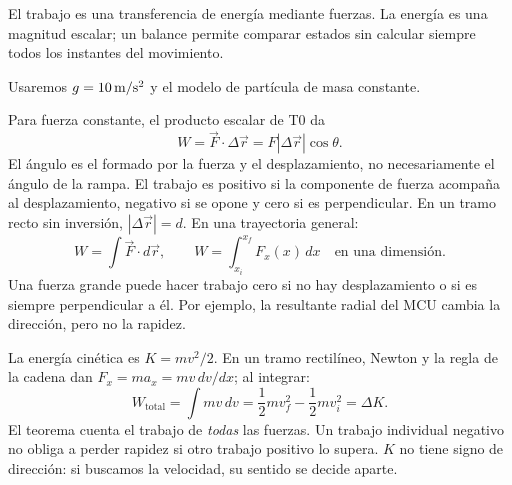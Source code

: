 \documentclass[11pt,a4paper]{article}
\begin{document}
\shorthandoff{<>}
\color{Ink}
El trabajo es una transferencia de energ\'ia mediante fuerzas.
La energ\'ia es una magnitud escalar; un balance permite comparar estados sin
calcular siempre todos los instantes del movimiento.
\begin{lessonindex}
\end{lessonindex}
Usaremos $g=10\,\mathrm{m/s^2}$ y el modelo de part\'icula de masa constante.
\precisionnote

Para fuerza constante, el producto escalar de T0 da
\[
W=\vec F\cdot\Delta\vec r=F|\Delta\vec r|\cos\theta.
\]
El \'angulo es el formado por la fuerza y el desplazamiento, no necesariamente
el \'angulo de la rampa. El trabajo es positivo si la componente de fuerza
acompa\~na al desplazamiento, negativo si se opone y cero si es perpendicular.
En un tramo recto sin inversi\'on, $|\Delta\vec r|=d$.
En una trayectoria general:
\[
W=\int\vec F\cdot d\vec r,\qquad
W=\int_{x_i}^{x_f}F_x(x)\,dx\quad\text{en una dimensi\'on}.
\]
Una fuerza grande puede hacer trabajo cero si no hay desplazamiento o si es
siempre perpendicular a \'el. Por ejemplo, la resultante radial del MCU cambia
la direcci\'on, pero no la rapidez.

La energ\'ia cin\'etica es $K=mv^2/2$. En un tramo rectil\'ineo,
Newton y la regla de la cadena dan
$F_x=ma_x=mv\,dv/dx$; al integrar:
\[
W_{\mathrm{total}}=\int mv\,dv
=\frac12mv_f^2-\frac12mv_i^2=\Delta K.
\]
El teorema cuenta el trabajo de \emph{todas} las fuerzas.
Un trabajo individual negativo no obliga a perder rapidez si otro trabajo positivo
lo supera. $K$ no tiene signo de direcci\'on: si buscamos la velocidad, su sentido
se decide aparte.
\end{document}
